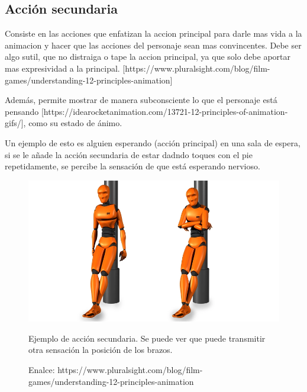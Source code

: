 \documentclass{article}
\begin{document}
\subsection{Acción secundaria}

Consiste en las acciones que enfatizan la accion principal para darle mas vida a la animacion y hacer que las acciones del personaje sean mas convincentes. Debe ser algo sutil, que no distraiga o tape la accion principal, ya que solo debe aportar mas expresividad a la principal. [https://www.pluralsight.com/blog/film-games/understanding-12-principles-animation]

\bigskip

Además, permite mostrar de manera subconsciente lo que el personaje está pensando [https://idearocketanimation.com/13721-12-principles-of-animation-gifs/], como su estado de ánimo.

\bigskip

Un ejemplo de esto es alguien esperando (acción principal) en una sala de espera, si se le añade la acción secundaria de estar dadndo toques con el pie repetidamente, se percibe la sensación de que está esperando nervioso.

\begin{figure}[H]
    \centering
    \includegraphics[width=\textwidth]{imagenes/secondary-action.png}
    \caption{Ejemplo de acción secundaria. Se puede ver que puede transmitir otra sensación la posición de los brazos.}
    \caption{Enalce: https://www.pluralsight.com/blog/film-games/understanding-12-principles-animation}
\end{figure}
\end{document}
